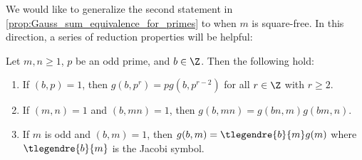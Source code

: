         We would like to generalize the second statement in \cref{prop:Gauss_sum_equivalence_for_primes} to when $m$ is square-free. In this direction, a series of reduction properties will be helpful:

        \begin{proposition}\label{prop:quadratic_Gauss_sum_reduction}
          Let $m,n \ge 1$, $p$ be an odd prime, and $b \in \Z$. Then the following hold:
          \begin{enumerate}[label=(\roman*)]
            \item If $(b,p) = 1$, then $g(b,p^{r}) = pg(b,p^{r-2})$ for all $r \in \Z$ with $r \ge 2$.
            \item If $(m,n) = 1$ and $(b,mn) = 1$, then $g(b,mn) = g(bn,m)g(bm,n)$.
            \item If $m$ is odd and $(b,m) = 1$, then $g(b,m) = \tlegendre{b}{m}g(m)$ where $\tlegendre{b}{m}$ is the Jacobi symbol.
          \end{enumerate}
        \end{proposition}
